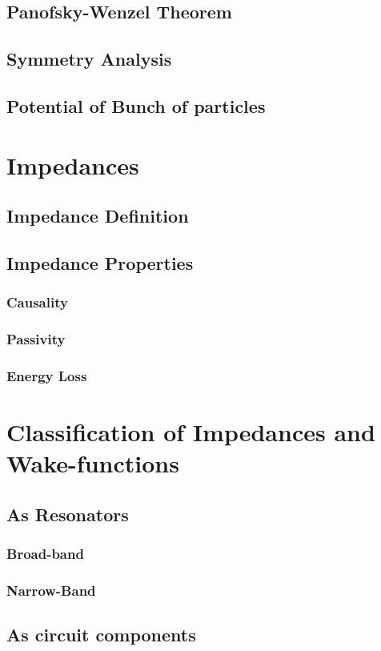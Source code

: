 \documentclass[
	12pt,				%
	openright,			%
	oneside,			%
	a4paper,		%
	chapter=TITLE,		%
	section=TITLE,		%
    brazil,				%
	english,			%
	sumario=tradicional,
	]{abntex2}
\begin{document}
    \subsection{Panofsky-Wenzel Theorem}
    \subsection{Symmetry Analysis}
    \subsection{Potential of Bunch of particles}
  \section{Impedances}
    \subsection{Impedance Definition}
    \subsection{Impedance Properties}
      \subsubsection{Causality}
      \subsubsection{Passivity}
      \subsubsection{Energy Loss}
  \section{Classification of Impedances and Wake-functions}
    \subsection{As Resonators}
      \subsubsection{Broad-band}
      \subsubsection{Narrow-Band}
    \subsection{As circuit components}
\end{document}
